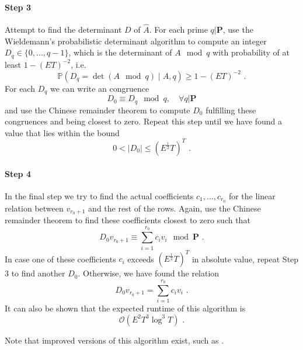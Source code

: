 \documentclass[paper=a4, fontsize=11pt]{scrartcl} %
\numberwithin{equation}{section} %
\numberwithin{figure}{section} %
\numberwithin{table}{section} %
\begin{document}
\paragraph{Step 3} Attempt to find the determinant $D$ of $\hat{A}$. For each prime $q|\boldsymbol{P}$, use the Wieldemann's probabilistic determinant algorithm \citep{wiedemann1986solving} to compute an integer $D_q\in\{0,...,q-1\}$, which is the determinant of $A\mod q$ with probability of at least $1-(ET)^{-2}$, i.e.
\begin{equation}
\mathbb{P}(D_q = \det(A\mod q)\mid A,q) \geq 1-(ET)^{-2}
\text{ .}
\end{equation}
For each $D_q$ we can write an congruence
\begin{equation}
D_0 \equiv D_q \mod q,\quad\forall q|\boldsymbol{P}
\end{equation}
and use the Chinese remainder theorem to compute $D_0$ fulfilling these congruences and being closest to zero. Repeat this step until we have found a value that lies within the bound
\begin{equation}
0 < |D_0| \leq (E^{\frac{1}{2}}T)^T
\text{ .}
\end{equation}

\paragraph{Step 4} In the final step we try to find the actual coefficients $c_1,...,c_{r_0}$ for the linear relation between $v_{r_0+1}$ and the rest of the rows. Again, use the Chinese remainder theorem to find these coefficients closest to zero such that
\begin{equation}
D_0v_{r_0+1}\equiv\sum_{i=1}^{r_0}c_iv_i\mod\boldsymbol{P}
\text{ .}
\end{equation}
In case one of these coefficients $c_i$ exceeds $(E^{\frac{1}{2}}T)^T$ in absolute value, repeat Step 3 to find another $D_0$. Otherwise, we have found the relation
\begin{equation}
D_0v_{r_0+1}=\sum_{i=1}^{r_0}c_iv_i
\text{ .}
\end{equation}
It can also be shown that the expected runtime of this algorithm is
\begin{equation}
\mathcal{O}(E^2T^3\log^3T)
\text{ .}
\end{equation}

Note that improved versions of this algorithm exist, such as \citep{joux2003improvements}.

\end{document}

